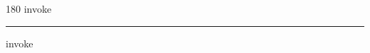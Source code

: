 
\begin{frame}
\begin{center}
\begin{turn}{180}
{\fontsize{2.5cm}{1em}\selectfont invoke}
\end{turn}
\vspace{1em}\par  
\hrule
\vspace{1em}\par  
{\fontsize{2.5cm}{1em}\selectfont invoke}
\end{center}
\end{frame}
